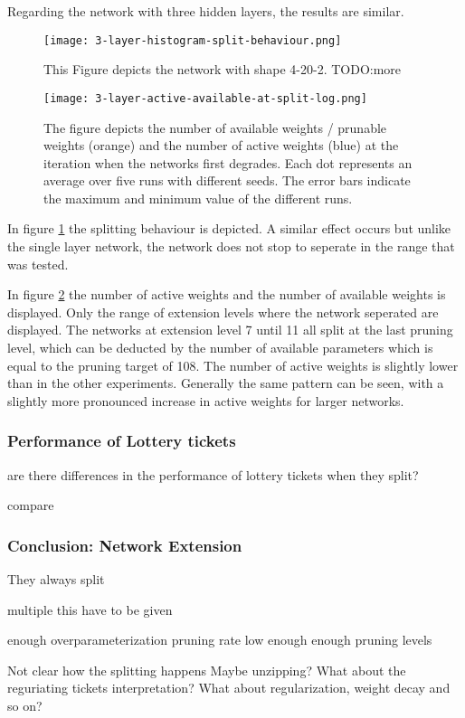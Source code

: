 Regarding the network with three hidden layers, the results are similar.
\begin{figure}[ht]
    \centering
    \texttt{[image: 3-layer-histogram-split-behaviour.png]}
    \caption{This Figure depicts the network with shape 4-20-2.
    TODO:more }
    \label{fig:3layer-histogram}
\end{figure}

\begin{figure}[ht]
    
    \centering
    \texttt{[image: 3-layer-active-available-at-split-log.png]}
    \caption{The figure depicts the number of available weights / prunable weights (orange) and the number of active weights (blue) at the iteration when the networks first degrades.
    Each dot represents an average over five runs with different seeds.
    The error bars indicate the maximum and minimum value of the different runs.}
    \label{fig:3layer-active}
\end{figure}

In figure \ref{fig:3layer-histogram} the splitting behaviour is depicted.
A similar effect occurs but unlike the single layer network, the network does not stop to seperate in the range that was tested. 

In figure \ref{fig:3layer-active} the number of active weights and the number of available weights is displayed.
Only the range of extension levels where the network seperated are displayed.
The networks at extension level 7 until 11 all split at the last pruning level, which can be deducted by the number of available parameters which is equal to the pruning target of 108.
The number of active weights is slightly lower than in the other experiments.
Generally the same pattern can be seen, with a slightly more pronounced increase in active weights for larger networks.

\subsubsection{Performance of Lottery tickets}
are there differences in the performance of lottery tickets when they split?

compare 

\subsubsection{Conclusion: Network Extension}
They always split

multiple this have to be given

enough overparameterization
pruning rate low enough
enough pruning levels

Not clear how the splitting happens
Maybe unzipping?
What about the reguriating tickets interpretation?
What about regularization, weight decay and so on?
